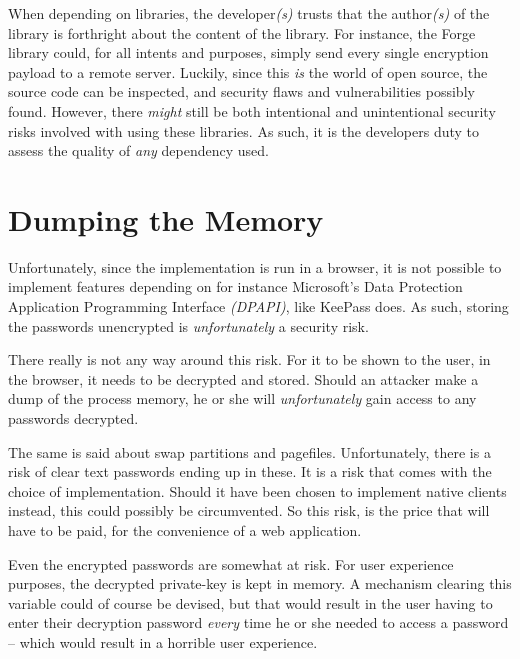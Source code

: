 		When depending on libraries, the developer\emph{(s)} trusts that the author\emph{(s)} of the library is forthright about the content of the library. For instance, the Forge library could, for all intents and purposes, simply send every single encryption payload to a remote server. Luckily, since this \emph{is} the world of open source, the source code can be inspected, and security flaws and vulnerabilities possibly found. However, there \emph{might} still be both intentional and unintentional security risks involved with using these libraries. As such, it is the developers duty to assess the quality of \emph{any} dependency used.

	\section{Dumping the Memory}
		Unfortunately, since the implementation is run in a browser, it is not possible to implement features depending on for instance Microsoft's Data Protection Application Programming Interface \emph{(DPAPI)}, like KeePass does. As such, storing the passwords unencrypted is \emph{unfortunately} a security risk.

		There really is not any way around this risk. For it to be shown to the user, in the browser, it needs to be decrypted and stored. Should an attacker make a dump of the process memory, he or she will \emph{unfortunately} gain access to any passwords decrypted. 

		The same is said about swap partitions and pagefiles. Unfortunately, there is a risk of clear text passwords ending up in these. It is a risk that comes with the choice of implementation. Should it have been chosen to implement native clients instead, this could possibly be circumvented. So this risk, is the price that will have to be paid, for the convenience of a web application.

		Even the encrypted passwords are somewhat at risk. For user experience purposes, the decrypted private-key is kept in memory. A mechanism clearing this variable could of course be devised, but that would result in the user having to enter their decryption password \emph{every} time he or she needed to access a password -- which would result in a horrible user experience.



